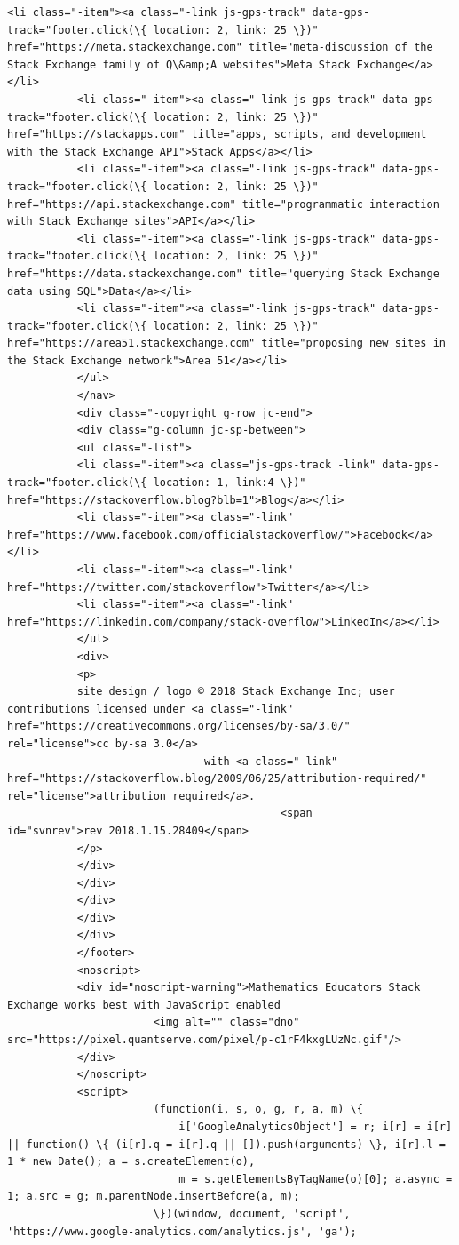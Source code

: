 \documentclass[11pt]{article}
\begin{document}
\begin{Verbatim}[commandchars=\\\{\}]
           <li class="-item"><a class="-link js-gps-track" data-gps-track="footer.click(\{ location: 2, link: 25 \})" href="https://meta.stackexchange.com" title="meta-discussion of the Stack Exchange family of Q\&amp;A websites">Meta Stack Exchange</a></li>
           <li class="-item"><a class="-link js-gps-track" data-gps-track="footer.click(\{ location: 2, link: 25 \})" href="https://stackapps.com" title="apps, scripts, and development with the Stack Exchange API">Stack Apps</a></li>
           <li class="-item"><a class="-link js-gps-track" data-gps-track="footer.click(\{ location: 2, link: 25 \})" href="https://api.stackexchange.com" title="programmatic interaction with Stack Exchange sites">API</a></li>
           <li class="-item"><a class="-link js-gps-track" data-gps-track="footer.click(\{ location: 2, link: 25 \})" href="https://data.stackexchange.com" title="querying Stack Exchange data using SQL">Data</a></li>
           <li class="-item"><a class="-link js-gps-track" data-gps-track="footer.click(\{ location: 2, link: 25 \})" href="https://area51.stackexchange.com" title="proposing new sites in the Stack Exchange network">Area 51</a></li>
           </ul>
           </nav>
           <div class="-copyright g-row jc-end">
           <div class="g-column jc-sp-between">
           <ul class="-list">
           <li class="-item"><a class="js-gps-track -link" data-gps-track="footer.click(\{ location: 1, link:4 \})" href="https://stackoverflow.blog?blb=1">Blog</a></li>
           <li class="-item"><a class="-link" href="https://www.facebook.com/officialstackoverflow/">Facebook</a></li>
           <li class="-item"><a class="-link" href="https://twitter.com/stackoverflow">Twitter</a></li>
           <li class="-item"><a class="-link" href="https://linkedin.com/company/stack-overflow">LinkedIn</a></li>
           </ul>
           <div>
           <p>
           site design / logo © 2018 Stack Exchange Inc; user contributions licensed under <a class="-link" href="https://creativecommons.org/licenses/by-sa/3.0/" rel="license">cc by-sa 3.0</a>
                               with <a class="-link" href="https://stackoverflow.blog/2009/06/25/attribution-required/" rel="license">attribution required</a>.
                                           <span id="svnrev">rev 2018.1.15.28409</span>
           </p>
           </div>
           </div>
           </div>
           </div>
           </div>
           </footer>
           <noscript>
           <div id="noscript-warning">Mathematics Educators Stack Exchange works best with JavaScript enabled
                       <img alt="" class="dno" src="https://pixel.quantserve.com/pixel/p-c1rF4kxgLUzNc.gif"/>
           </div>
           </noscript>
           <script>
                       (function(i, s, o, g, r, a, m) \{
                           i['GoogleAnalyticsObject'] = r; i[r] = i[r] || function() \{ (i[r].q = i[r].q || []).push(arguments) \}, i[r].l = 1 * new Date(); a = s.createElement(o),
                           m = s.getElementsByTagName(o)[0]; a.async = 1; a.src = g; m.parentNode.insertBefore(a, m);
                       \})(window, document, 'script', 'https://www.google-analytics.com/analytics.js', 'ga');
           

\end{Verbatim}
\end{document}
